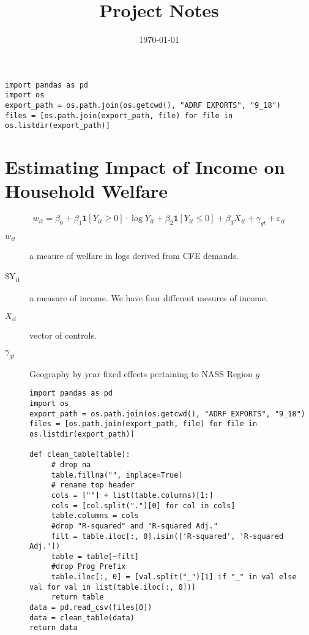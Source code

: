 \documentclass[11pt]{article}
\date{\today}
\title{Project Notes}
\begin{document}
\maketitle
\tableofcontents

\begin{verbatim}
import pandas as pd
import os
export_path = os.path.join(os.getcwd(), "ADRF EXPORTS", "9_18")
files = [os.path.join(export_path, file) for file in os.listdir(export_path)]
\end{verbatim}

\section{Estimating Impact of Income on Household Welfare}
\label{sec:orgdd5831b}

\[
w_{it} = \beta_{0} + \beta_{1}\mathbf{1}[Y_{it} \geq 0] \cdot \log{Y_{it}} + \beta_{2}\mathbf{1}[Y_{it} \leq 0 ] + \beta_{3} X_{it} + \gamma_{gt} + \varepsilon_{it}
\]

\begin{description}
\item[{\(w_{it}\)}] a meaure of welfare in logs derived from CFE demands.
\item[{\$Y\textsubscript{it}}] a measure of income. We have four different mesures of income.
\item[{\(X_{it}\)}] vector of controls.
\item[{\(\gamma_{gt}\)}] Geography by year fixed effects pertaining to NASS Region \(g\)

\begin{verbatim}
import pandas as pd
import os
export_path = os.path.join(os.getcwd(), "ADRF EXPORTS", "9_18")
files = [os.path.join(export_path, file) for file in os.listdir(export_path)]

def clean_table(table):
     # drop na
     table.fillna("", inplace=True)
     # rename top header
     cols = [""] + list(table.columns)[1:]
     cols = [col.split(".")[0] for col in cols]
     table.columns = cols
     #drop "R-squared" and "R-squared Adj."
     filt = table.iloc[:, 0].isin(['R-squared', 'R-squared Adj.'])
     table = table[~filt]
     #drop Prog Prefix
     table.iloc[:, 0] = [val.split("_")[1] if "_" in val else val for val in list(table.iloc[:, 0])]
     return table
data = pd.read_csv(files[0])
data = clean_table(data)
return data
\end{verbatim}
\end{description}
\end{document}
